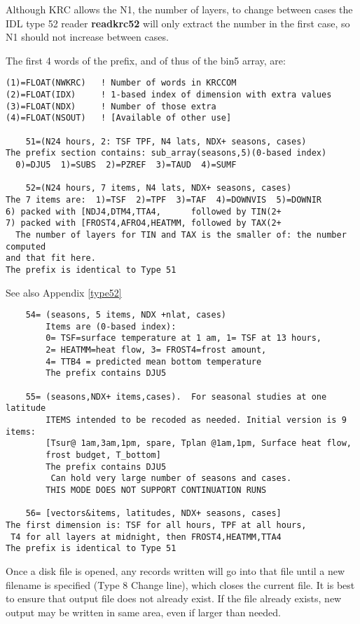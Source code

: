 \documentclass[draft]{article}  %
\newcommand{\np}{\textbf}  %
\begin{document}
Although KRC allows the N1, the number of layers, to change between cases the
IDL type 52 reader \np{readkrc52} will only extract the number in the first
case, so N1 should not increase between cases.

The first 4 words of the prefix, and of thus of the bin5 array, are:
\vspace{-3.mm} 
\begin{verbatim}
(1)=FLOAT(NWKRC)   ! Number of words in KRCCOM
(2)=FLOAT(IDX)     ! 1-based index of dimension with extra values
(3)=FLOAT(NDX)     ! Number of those extra
(4)=FLOAT(NSOUT)   ! [Available of other use]

    51=(N24 hours, 2: TSF TPF, N4 lats, NDX+ seasons, cases)
The prefix section contains: sub_array(seasons,5)(0-based index)
  0)=DJU5  1)=SUBS  2)=PZREF  3)=TAUD  4)=SUMF

    52=(N24 hours, 7 items, N4 lats, NDX+ seasons, cases)
The 7 items are:  1)=TSF  2)=TPF  3)=TAF  4)=DOWNVIS  5)=DOWNIR
6) packed with [NDJ4,DTM4,TTA4,      followed by TIN(2+
7) packed with [FROST4,AFRO4,HEATMM, followed by TAX(2+
  The number of layers for TIN and TAX is the smaller of: the number computed 
and that fit here.
The prefix is identical to Type 51
\end{verbatim} 
See also Appendix \ref{type52}
\vspace{-3.mm}
\begin{verbatim}
    54= (seasons, 5 items, NDX +nlat, cases)
        Items are (0-based index): 
        0= TSF=surface temperature at 1 am, 1= TSF at 13 hours,
        2= HEATMM=heat flow, 3= FROST4=frost amount, 
        4= TTB4 = predicted mean bottom temperature
        The prefix contains DJU5 

    55= (seasons,NDX+ items,cases).  For seasonal studies at one latitude
        ITEMS intended to be recoded as needed. Initial version is 9 items:
        [Tsur@ 1am,3am,1pm, spare, Tplan @1am,1pm, Surface heat flow,
        frost budget, T_bottom]
        The prefix contains DJU5        
         Can hold very large number of seasons and cases. 
        THIS MODE DOES NOT SUPPORT CONTINUATION RUNS

    56= [vectors&items, latitudes, NDX+ seasons, cases]
The first dimension is: TSF for all hours, TPF at all hours, 
 T4 for all layers at midnight, then FROST4,HEATMM,TTA4
The prefix is identical to Type 51
\end{verbatim}

Once a disk file is opened, any records written will go into that file until a
new filename is specified (Type 8 Change line), which closes the current file.
It is best to ensure that output file does not already exist. If the file
already exists, new output may be written in same area, even if larger than
needed.
\end{document}
